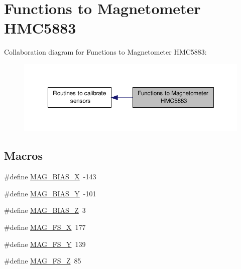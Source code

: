 \hypertarget{group__mag}{\section{Functions to Magnetometer H\-M\-C5883}
\label{group__mag}
}
Collaboration diagram for Functions to Magnetometer H\-M\-C5883\-:
\nopagebreak
\begin{figure}[H]
\begin{center}
\leavevmode
\includegraphics[width=350pt]{group__mag}
\end{center}
\end{figure}
\subsection*{Macros}
\begin{DoxyCompactItemize}
\item 
\#define \hyperlink{group__mag_ga33f53b04fe0f887e8d9d99e4374c0ddf}{M\-A\-G\-\_\-\-B\-I\-A\-S\-\_\-\-X}~-\/143
\item 
\#define \hyperlink{group__mag_ga92407f4dfd1c63cede9a5307b379c569}{M\-A\-G\-\_\-\-B\-I\-A\-S\-\_\-\-Y}~-\/101
\item 
\#define \hyperlink{group__mag_ga9662c4fff54f93bcc4e043e84e79d623}{M\-A\-G\-\_\-\-B\-I\-A\-S\-\_\-\-Z}~3
\item 
\#define \hyperlink{group__mag_gaa49abc19ca0fda3324df06bddae2c1d4}{M\-A\-G\-\_\-\-F\-S\-\_\-\-X}~177
\item 
\#define \hyperlink{group__mag_ga5c5e64196104a5e5ebac3c594220eb5c}{M\-A\-G\-\_\-\-F\-S\-\_\-\-Y}~139
\item 
\#define \hyperlink{group__mag_gaebfc43ba340d89fa86b4a5c07cc7c924}{M\-A\-G\-\_\-\-F\-S\-\_\-\-Z}~85
\end{DoxyCompactItemize}
